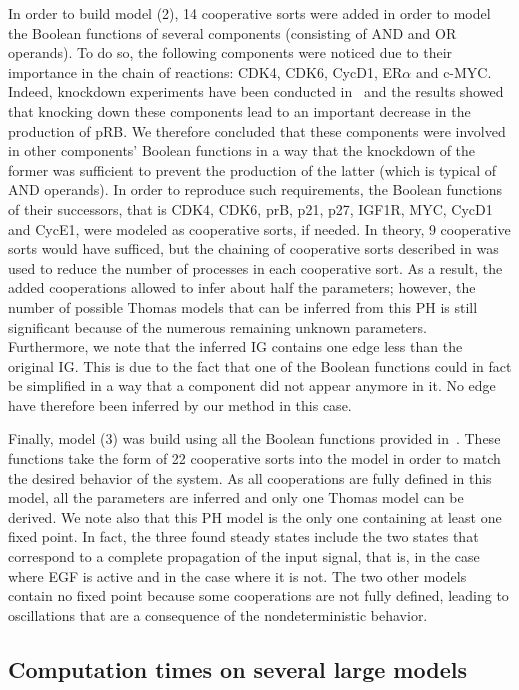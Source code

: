 In order to build model (2), 14 cooperative sorts were added in order to model the Boolean functions of several components
(consisting of AND and OR operands).
To do so, the following components were noticed due to their importance in the chain of reactions:
CDK4, CDK6, CycD1, ER$\alpha$ and c-MYC.
Indeed, knockdown experiments have been conducted in~\cite{Sahin09}
and the results showed that knocking down these components lead to an important decrease in the production of pRB.
We therefore concluded that these components were involved in other components' Boolean functions
in a way that the knockdown of the former was sufficient to prevent the production of the latter (which is typical of AND operands).
In order to reproduce such requirements, the Boolean functions of their successors,
that is CDK4, CDK6, prB, p21, p27, IGF1R, MYC, CycD1 and CycE1,
were modeled as cooperative sorts, if needed.
In theory, 9 cooperative sorts would have sufficed, but the chaining of cooperative sorts described
in  was used to reduce the number of processes in each cooperative sort.
As a result, the added cooperations allowed to infer about half the parameters;
however, the number of possible Thomas models that can be inferred from this PH is still significant
because of the numerous remaining unknown parameters.
Furthermore, we note that the inferred IG contains one edge less than the original IG. This is due to the fact that
one of the Boolean functions could in fact be simplified in a way that a component did not appear anymore in it.
No edge have therefore been inferred by our method in this case.

Finally, model (3) was build using all the Boolean functions provided in~\cite{Sahin09}.
These functions take the form of 22 cooperative sorts into the model in order to match the desired behavior of the system.
As all cooperations are fully defined in this model, all the parameters are inferred and only one Thomas model can be derived.
We note also that this PH model is the only one containing at least one fixed point.
In fact, the three found steady states include the two states that correspond to a complete propagation of the input signal,
that is, in the case where EGF is active and in the case where it is not.
The two other models contain no fixed point because some cooperations are not fully defined,
leading to oscillations that are a consequence of the nondeterministic behavior.



\subsection{Computation times on several large models}\label{ssec:cpu}

